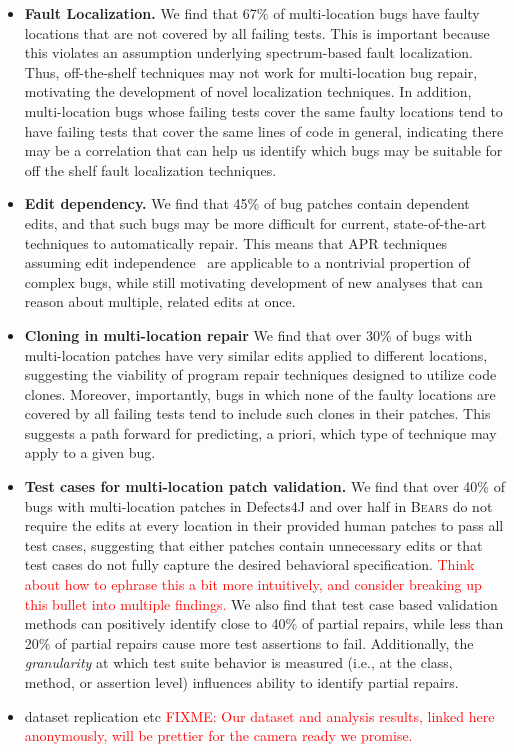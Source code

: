 \documentclass[10pt, conference]{IEEEtran}
\newcommand\todo[1]{\textcolor{red}{#1}}
\newcommand\bears{\textsc{Bears}\xspace}
\begin{document}
\begin{itemize}
\item \textbf{Fault Localization.}  We find that 67\% of multi-location bugs have faulty 
locations that are not
  covered by all failing tests.  This is important because this violates an assumption underlying 
  spectrum-based
  fault localization. Thus, off-the-shelf techniques may not work for
  multi-location bug repair, motivating the development of novel localization
  techniques. 
  In addition, multi-location bugs whose failing tests cover the same faulty locations tend to 
  have failing tests that cover the same lines of code in general, indicating there may be a 
  correlation that can help us identify which bugs may be suitable for off the shelf fault 
  localization techniques.
\item \textbf{Edit dependency.} We 
find that 45\% of bug patches contain dependent edits, and that such bugs
may be more difficult for current, state-of-the-art
techniques to automatically repair.  This means that APR techniques assuming edit
independence~\cite{saha2019harnessing, theotherone} are applicable to a nontrivial propertion of complex bugs, while
still motivating development of new analyses that can reason about multiple,
related edits at once. 
\item \textbf{Cloning in multi-location repair} We find that over 30\% of bugs with multi-location
patches have very similar edits applied to different locations, suggesting the viability of 
program repair techniques designed to utilize code clones. Moreover, importantly, bugs in which 
none of the faulty locations are covered by all failing tests tend to include
such clones in their patches.  This suggests a path forward for predicting, a
priori, which type of technique may apply to a given bug. 
\item \textbf{Test cases for multi-location patch validation.} We find that over 40\% of bugs 
with multi-location
  patches in Defects4J and over half in \bears do not require the edits at every
  location in their provided human patches to pass all test cases, suggesting
  that either patches contain unnecessary edits or that test cases
  do not fully capture the desired behavioral specification.  \todo{Think about
    how to ephrase this a bit more intuitively, and consider breaking up this
    bullet into multiple findings.} We also find that test 
  case based validation methods can positively identify close to 40\% of partial repairs,
  while less than
  20\% of partial repairs cause more test assertions to fail. Additionally, the 
  \emph{granularity} at which test suite behavior is measured (i.e., at the class,
  method, or assertion level) influences ability to identify partial
  repairs. 
\item dataset replication etc \todo{FIXME: Our dataset and analysis results,
    linked here anonymously, will be prettier for the camera ready we promise.}
\end{itemize}
\end{document}
